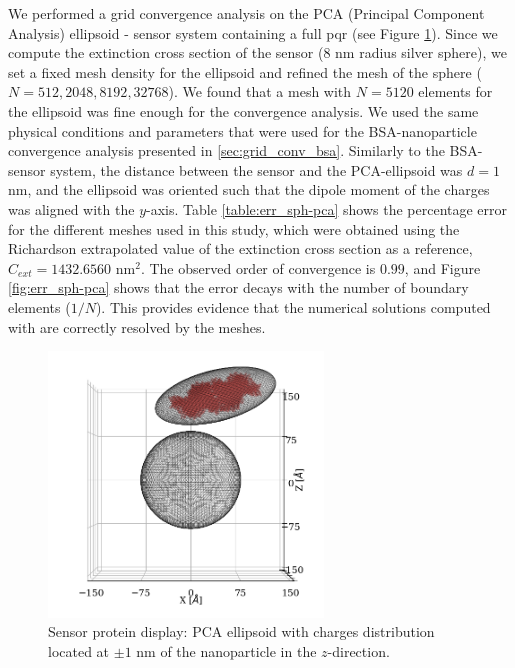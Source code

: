 We performed a grid convergence analysis on the PCA (Principal Component Analysis) ellipsoid - sensor system containing a full pqr (see Figure \ref{fig:one_pca_sketch}). 
Since we compute the extinction cross section of the sensor (8 nm radius silver sphere), we set a fixed mesh density for the ellipsoid and refined
the mesh of the sphere ($N=512, 2048, 8192, 32768$). We found that a mesh with $N=5120$ elements for the ellipsoid was fine enough for the convergence analysis.
We used the same physical conditions and parameters that were used for the BSA-nanoparticle convergence analysis presented in
\ref{sec:grid_conv_bsa}. Similarly to the BSA-sensor system, the distance between the sensor and the PCA-ellipsoid 
was $d=1$ nm, and the ellipsoid was oriented such that the dipole moment of the charges was aligned with the $y$-axis. 
Table \ref{table:err_sph-pca} shows the percentage error for the different meshes used in this study, which were 
obtained using the Richardson extrapolated value of the extinction cross section as a reference, $C_{ext} = 1432.6560$ nm$^2$. The observed order
of convergence is $0.99$, and Figure \ref{fig:err_sph-pca} shows that the error decays with the number of boundary elements ($1/N$). This provides
evidence that the numerical solutions computed with \pygbe are correctly resolved by the meshes.  

\begin{figure}%
    \centering
    \includegraphics[width=0.65\textwidth]{viz/one_pca_full_display.png} 
    \caption{Sensor protein display: PCA ellipsoid with charges distribution located at $\pm 1$ nm of the 
    nanoparticle in the $z$-direction.}
    \label{fig:one_pca_sketch}
 \end{figure}


